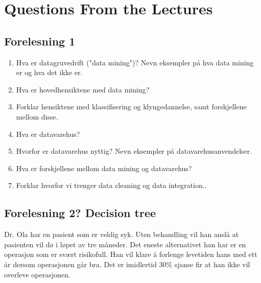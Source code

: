 \chapter{Questions From the Lectures}

	\section{Forelesning 1}
		\begin{enumerate}
			\item Hva er datagruvedrift ("data mining")? Nevn eksempler på hva data mining er
			og hva det ikke er. 
			\item Hva er hovedhensiktene med data mining?
			\item Forklar hensiktene med klassifisering og klyngedannelse, samt forskjellene
			mellom disse. 
			\item Hva er datavarehus?
			\item Hvorfor er datavarehus nyttig? Nevn eksempler på datavarehusanvendelser.
			\item Hva er forskjellene mellom data mining og datavarehus?
			\item Forklar hvorfor vi trenger data cleaning og data integration..
		\end{enumerate}

	

	\section{Forelesning 2? Decision tree}

		Dr. Ola har en pasient som er veldig syk. Uten behandling vil han anslå at pasienten vil dø i løpet
		av tre måneder. Det eneste alternativet han har er en operasjon som er svært risikofull. Han vil klare
		å forlenge levetiden hans med ett år dersom operasjonen går bra. Det er imidlertid 30\% sjanse
		fir at han ikke vil overleve operasjonen. 

